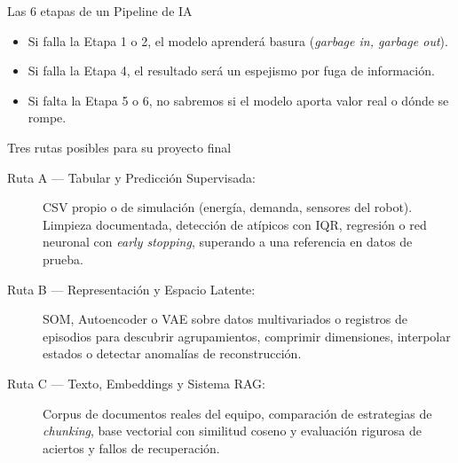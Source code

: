 \documentclass[aspectratio=169,11pt]{beamer}
\begin{document}
\begin{frame}{Las 6 etapas de un Pipeline de IA}
  \centering
  \vfill
  \begin{itemize}
    \item Si falla la Etapa 1 o 2, el modelo aprenderá basura (\emph{garbage in, garbage out}).
    \item Si falla la Etapa 4, el resultado será un espejismo por fuga de información.
    \item Si falta la Etapa 5 o 6, no sabremos si el modelo aporta valor real o dónde se rompe.
  \end{itemize}
\end{frame}

\begin{frame}{Tres rutas posibles para su proyecto final}
  \begin{description}
    \item[Ruta A — Tabular y Predicción Supervisada:]
      CSV propio o de simulación (energía, demanda, sensores del robot). Limpieza documentada, detección de atípicos con IQR, regresión o red neuronal con \emph{early stopping}, superando a una referencia en datos de prueba.
    \vspace{0.2cm}
    \item[Ruta B — Representación y Espacio Latente:]
      SOM, Autoencoder o VAE sobre datos multivariados o registros de episodios para descubrir agrupamientos, comprimir dimensiones, interpolar estados o detectar anomalías de reconstrucción.
    \vspace{0.2cm}
    \item[Ruta C — Texto, Embeddings y Sistema RAG:]
      Corpus de documentos reales del equipo, comparación de estrategias de \emph{chunking}, base vectorial con similitud coseno y evaluación rigurosa de aciertos y fallos de recuperación.
  \end{description}
\end{frame}
\end{document}
